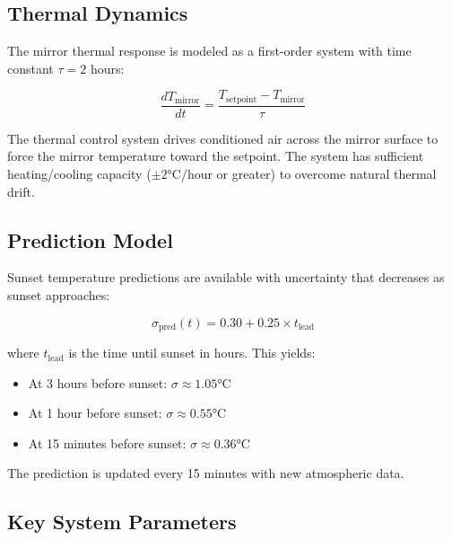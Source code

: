 \documentclass[11pt,letterpaper]{article}
\begin{document}
\subsection{Thermal Dynamics}

The mirror thermal response is modeled as a first-order system with time constant $\tau = 2$ hours:

\begin{equation}
\frac{dT_{\text{mirror}}}{dt} = \frac{T_{\text{setpoint}} - T_{\text{mirror}}}{\tau}
\label{eq:thermal_dynamics}
\end{equation}

The thermal control system drives conditioned air across the mirror surface to force the mirror temperature toward the setpoint. The system has sufficient heating/cooling capacity ($\pm 2$°C/hour or greater) to overcome natural thermal drift.

\subsection{Prediction Model}

Sunset temperature predictions are available with uncertainty that decreases as sunset approaches:

\begin{equation}
\sigma_{\text{pred}}(t) = 0.30 + 0.25 \times t_{\text{lead}}
\label{eq:prediction_uncertainty}
\end{equation}

where $t_{\text{lead}}$ is the time until sunset in hours. This yields:
\begin{itemize}
    \item At 3 hours before sunset: $\sigma \approx 1.05$°C
    \item At 1 hour before sunset: $\sigma \approx 0.55$°C
    \item At 15 minutes before sunset: $\sigma \approx 0.36$°C
\end{itemize}

The prediction is updated every 15 minutes with new atmospheric data.

\subsection{Key System Parameters}
\end{document}
